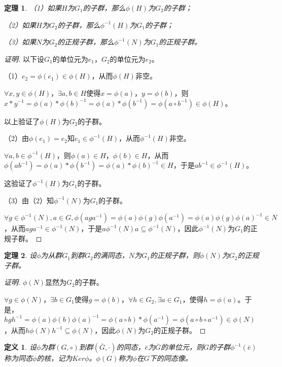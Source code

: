 \documentclass{article}
\newtheorem{Def}{定义}
\newtheorem{Thm}{定理}
\begin{document}
\begin{CJK*}{UTF8}{gbsn}
\begin{Thm}
  （1）如果$H$为$G_1$的子群，那么$\phi(H)$为$G_2$的子群；

  （2）如果$H$为$G_2$的子群，那么$\phi^{-1}(H)$为$G_1$的子群；

  （3）如果$N$为$G_2$的正规子群，那么$\phi^{-1}(N)$为$G_1$的正规子群。
\end{Thm}
\begin{proof}[证明]
  以下设$G_1$的单位元为$e_1$，$G_2$的单位元为$e_2$。

  （1）$e_2=\phi(e_1)\in \phi(H)$，从而$\phi(H)$非空。

  $\forall x, y\in \phi(H)$，$\exists a,b\in H$使得$x=\phi(a)$，$y=\phi(b)$，则$x*y^{-1}=\phi(a)*\phi(b)^{-1}=\phi(a)*\phi(b^{-1})=\phi(a\circ b^{-1})\in \phi(H)$。

  以上验证了$\phi(H)$为$G_2$的子群。

  （2）由$\phi(e_1)=e_2$知$e_1\in \phi^{-1}(H)$，从而$\phi^{-1}(H)$非空。

  $\forall a,b\in \phi^{-1}(H)$，则$\phi(a)\in H$，$\phi(b)\in H$，从而$\phi(ab^{-1})=\phi(a)*\phi(b^{-1})=\phi(a)*\phi(b)^{-1}\in H$，于是$ab^{-1}\in \phi^{-1}(H)$。

  这验证了$\phi^{-1}(H)$为$G_1$的子群。

  （3）由（2）知$\phi^{-1}(N)$为$G_1$的子群。

  $\forall g\in \phi^{-1}(N), a\in G, \phi(aga^{-1})=\phi(a)\phi(g)\phi(a^{-1})=\phi(a)\phi(g)\phi(a)^{-1}\in N$，从而$aga^{-1}\in \phi^{-1}(N)$，于是$a\phi^{-1}(N)a\subseteq \phi^{-1}(N)$，因此$\phi^{-1}(N)$为$G_1$的正规子群。
\end{proof}
\begin{Thm}
设$\phi$为从群$G_1$到群$G_2$的满同态，$N$为$G_1$的正规子群，则$\phi(N)$为$G_2$的正规子群。
\end{Thm}
\begin{proof}[证明]
  $\phi(N)$显然为$G_2$的子群。

  $\forall g\in \phi(N)$，$\exists b\in G_1$使得$g=\phi(b)$，$\forall h\in G_2,\exists a\in G_1$，使得$h=\phi(a)$。于是，$hgh^{-1}=\phi(a)\phi(b)\phi(a)^{-1}=\phi(a\circ b)*\phi(a^{-1})=\phi(a\circ b\circ a^{-1})\in \phi(N)$，从而$h\phi(N)h^{-1}\subseteq \phi(N)$，因此$\phi(N)$为$G_2$的正规子群。
\end{proof}
\begin{Def}
设$\phi$为群$(G,\circ)$到群$(\bar{G},\cdot)$的同态，$\bar{e}$为$\bar{G}$的单位元，则$G$的子群$\phi^{-1}(\bar{e})$称为同态$\phi$的核，记为$Ker \phi$。$\phi(G)$称为$\phi$在$G$下的同态像。
\end{Def}


\end{CJK*}
\end{document}
